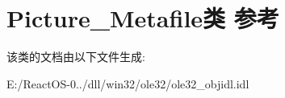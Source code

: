 \hypertarget{class_picture___metafile}{}\section{Picture\+\_\+\+Metafile类 参考}
\label{class_picture___metafile}


该类的文档由以下文件生成\+:\begin{DoxyCompactItemize}
\item 
E\+:/\+React\+O\+S-\/0../dll/win32/ole32/ole32\+\_\+objidl.\+idl\end{DoxyCompactItemize}
